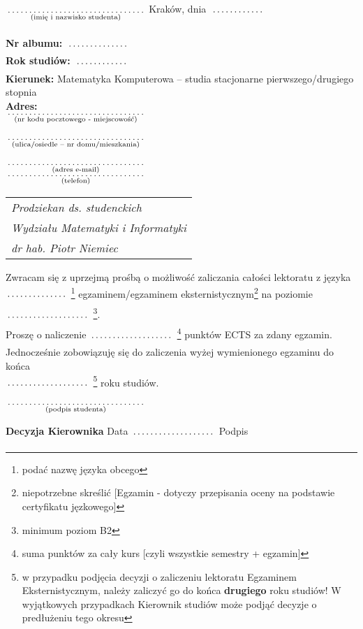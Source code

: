 \documentclass[a4paper,11pt]{article}
\newcommand{\fillField}[2]{
    $\underset{\text{#1}}{\parbox[t]{#2}{\dotfill}}$
}
\begin{document}
\noindent
\fillField{(imię i nazwisko studenta)}{5cm} \hfill Kraków, dnia \fillField{}{2cm} \\\\
\textbf{Nr albumu:}   \fillField{}{2.3cm}\\
\textbf{Rok studiów:} \fillField{}{2cm}\\
\textbf{Kierunek:} Matematyka Komputerowa -- studia stacjonarne pierwszego/drugiego stopnia\\
\textbf{Adres:}\\
\fillField{(nr kodu pocztowego - miejscowość)}{5cm}\\\\
\fillField{(ulica/osiedle – nr domu/mieszkania)}{5cm}\\\\
\fillField{(adres e-mail)}{5cm}\\
\fillField{(telefon)}{5cm}
\phantom{a}\hfill
\begin{tabular}[c]{@{}l@{}}
\textit{Prodziekan ds. studenckich} \\
\textit{Wydziału Matematyki i Informatyki}\\
\textit{dr hab. Piotr Niemiec}
\end{tabular}

\vskip 2.0cm


Zwracam się z uprzejmą prośbą o możliwość zaliczania całości
lektoratu z języka \\
\fillField{}{2.2cm}\footnote{podać nazwę języka obcego}
egzaminem/egzaminem eksternistycznym\footnote{niepotrzebne skreślić [Egzamin - dotyczy przepisania oceny na podstawie certyfikatu jęzkowego]}
na poziomie \fillField{}{3cm}\footnote{minimum poziom B2}. \\

\noindent
Proszę o naliczenie\fillField{}{3cm}\footnote{suma punktów za cały kurs [czyli wszystkie semestry + egzamin]} punktów ECTS za zdany egzamin.\\

\noindent
Jednocześnie zobowiązuję się do zaliczenia wyżej wymienionego egzaminu do końca\\\fillField{}{3cm}\footnote{w przypadku podjęcia decyzji o zaliczeniu lektoratu Egzaminem Eksternistycznym, należy zaliczyć go do końca \textbf{drugiego} roku studiów! W wyjątkowych przypadkach Kierownik studiów może podjąć decyzje o predłużeniu tego okresu} roku studiów.

\vskip 1cm

\hspace{\fill} \fillField{(podpis studenta)}{5cm} \hspace{2.0cm}
\vskip 3.0cm

\noindent
\textbf{Decyzja Kierownika} \dotfill
\vskip 0.5cm
\noindent
Data \fillField{}{3cm} Podpis \dotfill
\end{document}
